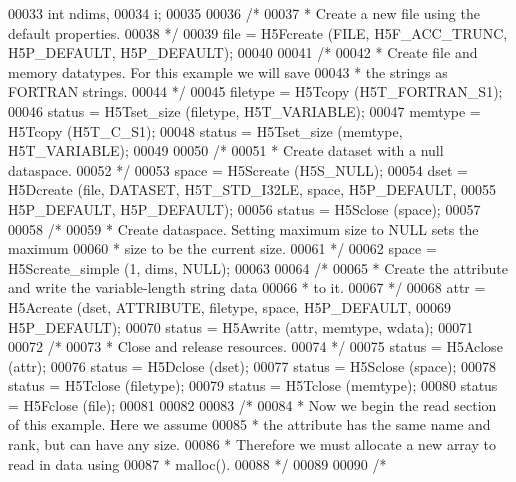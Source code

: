 \begin{DoxyCode}
00033     \textcolor{keywordtype}{int}         ndims,
00034                 i;
00035 
00036     \textcolor{comment}{/*}
00037 \textcolor{comment}{     * Create a new file using the default properties.}
00038 \textcolor{comment}{     */}
00039     file = H5Fcreate (FILE, H5F\_ACC\_TRUNC, H5P\_DEFAULT, H5P\_DEFAULT);
00040 
00041     \textcolor{comment}{/*}
00042 \textcolor{comment}{     * Create file and memory datatypes.  For this example we will save}
00043 \textcolor{comment}{     * the strings as FORTRAN strings.}
00044 \textcolor{comment}{     */}
00045     filetype = H5Tcopy (H5T\_FORTRAN\_S1);
00046     status = H5Tset\_size (filetype, H5T\_VARIABLE);
00047     memtype = H5Tcopy (H5T\_C\_S1);
00048     status = H5Tset\_size (memtype, H5T\_VARIABLE);
00049 
00050     \textcolor{comment}{/*}
00051 \textcolor{comment}{     * Create dataset with a null dataspace.}
00052 \textcolor{comment}{     */}
00053     space = H5Screate (H5S\_NULL);
00054     dset = H5Dcreate (file, DATASET, H5T\_STD\_I32LE, space, H5P\_DEFAULT,
00055                 H5P\_DEFAULT, H5P\_DEFAULT);
00056     status = H5Sclose (space);
00057 
00058     \textcolor{comment}{/*}
00059 \textcolor{comment}{     * Create dataspace.  Setting maximum size to NULL sets the maximum}
00060 \textcolor{comment}{     * size to be the current size.}
00061 \textcolor{comment}{     */}
00062     space = H5Screate\_simple (1, dims, NULL);
00063 
00064     \textcolor{comment}{/*}
00065 \textcolor{comment}{     * Create the attribute and write the variable-length string data}
00066 \textcolor{comment}{     * to it.}
00067 \textcolor{comment}{     */}
00068     attr = H5Acreate (dset, ATTRIBUTE, filetype, space, H5P\_DEFAULT,
00069                 H5P\_DEFAULT);
00070     status = H5Awrite (attr, memtype, wdata);
00071 
00072     \textcolor{comment}{/*}
00073 \textcolor{comment}{     * Close and release resources.}
00074 \textcolor{comment}{     */}
00075     status = H5Aclose (attr);
00076     status = H5Dclose (dset);
00077     status = H5Sclose (space);
00078     status = H5Tclose (filetype);
00079     status = H5Tclose (memtype);
00080     status = H5Fclose (file);
00081 
00082 
00083     \textcolor{comment}{/*}
00084 \textcolor{comment}{     * Now we begin the read section of this example.  Here we assume}
00085 \textcolor{comment}{     * the attribute has the same name and rank, but can have any size.}
00086 \textcolor{comment}{     * Therefore we must allocate a new array to read in data using}
00087 \textcolor{comment}{     * malloc().}
00088 \textcolor{comment}{     */}
00089 
00090     \textcolor{comment}{/*}

\end{DoxyCode}
